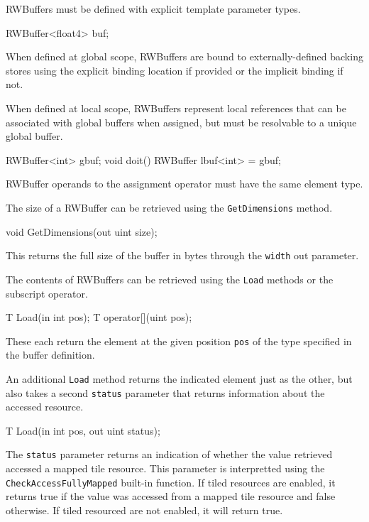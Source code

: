 
RWBuffers must be defined with explicit template parameter types.
\begin{HLSL}
  RWBuffer<float4> buf;
\end{HLSL}

When defined at global scope, RWBuffers are bound to externally-defined backing stores
using the explicit binding location if provided or the implicit binding if not.

When defined at local scope, RWBuffers represent local references
that can be associated with global buffers when assigned,
but must be resolvable to a unique global buffer.

\begin{HLSL}
  RWBuffer<int> gbuf;
  void doit() {
    RWBuffer lbuf<int> = gbuf;
  }
\end{HLSL}
RWBuffer operands to the assignment operator must have the same element type.


The size of a RWBuffer can be retrieved using the \texttt{GetDimensions} method.
\begin{HLSL}
void GetDimensions(out uint size);
\end{HLSL}

This returns the full size of the buffer in bytes through the \texttt{width} out parameter.


The contents of RWBuffers can be retrieved using the \texttt{Load} methods
or the subscript operator.

\begin{HLSL}
 T Load(in int pos);
 T operator[](uint pos);
\end{HLSL}

These each return the element at the given position \texttt{pos} of the type specified in the buffer definition.

An additional \texttt{Load} method returns the indicated element just as the other,
but also takes a second \texttt{status} parameter that returns information about the accessed resource.
\begin{HLSL}
 T Load(in int pos, out uint status);
\end{HLSL}

The \texttt{status} parameter returns an indication of whether the value retrieved accessed a mapped tile
resource. This parameter is interpretted using the \texttt{CheckAccessFullyMapped}
built-in function. If tiled resources are enabled, it returns true if the value was accessed from a mapped
tile resource and false otherwise. If tiled resourced are not enabled, it will return true.

